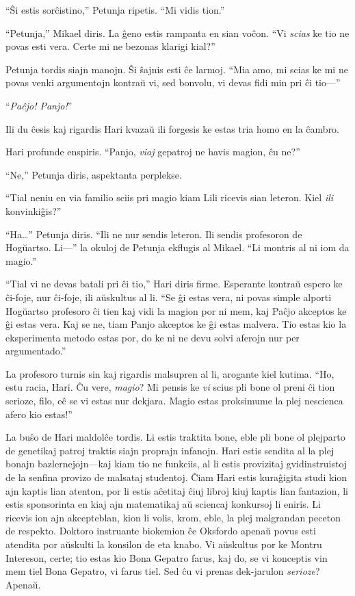 “Ŝi estis sorĉistino,” Petunja ripetis.
“Mi vidis tion.”

“Petunja,” Mikael diris.
La ĝeno estis rampanta en sian voĉon.
“Vi \emph{scias} ke tio ne povas esti vera.
Certe mi ne bezonas klarigi kial?”

Petunja tordis siajn manojn.
Ŝi ŝajnis esti ĉe larmoj.
“Mia amo, mi scias ke mi ne povas venki argumentojn kontraŭ vi, sed bonvolu, vi devas fidi min pri ĉi tio—”

“\emph{Paĉjo! Panjo!}”

Ili du ĉesis kaj rigardis Hari kvazaŭ ili forgesis ke estas tria homo en la ĉambro.

Hari profunde enspiris.
“Panjo, \emph{viaj} gepatroj ne havis magion, ĉu ne?”

“Ne,” Petunja diris, aspektanta perplekse.

“Tial neniu en via familio sciis pri magio kiam Lili ricevis sian leteron.
Kiel \emph{ili} konvinkiĝis?”

“Ha…” Petunja diris.
“Ili ne nur sendis leteron.
Ili sendis profesoron de Hogŭartso.
Li—” la okuloj de Petunja ekflugis al Mikael.
“Li montris al ni iom da magio.”

“Tial vi ne devas batali pri ĉi tio,” Hari diris firme.
Esperante kontraŭ espero ke ĉi-foje, nur ĉi-foje, ili aŭskultus al li.
“Se ĝi estas vera, ni povas simple alporti Hogŭartso profesoro ĉi tien kaj vidi la magion por ni mem, kaj Paĉjo akceptos ke ĝi estas vera.
Kaj se ne, tiam Panjo akceptos ke ĝi estas malvera.
Tio estas kio la eksperimenta metodo estas por, do ke ni ne devu solvi aferojn nur per argumentado.”

La profesoro turnis sin kaj rigardis malsupren al li, arogante kiel kutima.
“Ho, estu racia, Hari.
Ĉu vere, \emph{magio}?
Mi pensis ke \emph{vi} scius pli bone ol preni ĉi tion serioze, filo, eĉ se vi estas nur dekjara.
Magio estas proksimume la plej nescienca afero kio estas!”

La buŝo de Hari maldolĉe tordis.
Li estis traktita bone, eble pli bone ol plejparto de genetikaj patroj traktis siajn proprajn infanojn.
Hari estis sendita al la plej bonajn bazlernejojn—kaj kiam tio ne funkciis, al li estis provizitaj gvidinstruistoj de la senfina provizo de malsataj studentoj.
Ĉiam Hari estis kuraĝigita studi kion ajn kaptis lian atenton, por li estis aĉetitaj ĉiuj libroj kiuj kaptis lian fantazion, li estis sponsorinta en kiaj ajn matematikaj aŭ sciencaj konkursoj li eniris.
Li ricevis ion ajn akcepteblan, kion li volis, krom, eble, la plej malgrandan peceton de respekto.
Doktoro instruante biokemion ĉe Oksfordo apenaŭ povus esti atendita por aŭskulti la konsilon de eta knabo.
Vi aŭskultus por ke Montru Intereson, certe; tio estas kio Bona Gepatro farus, kaj do, se vi konceptis vin mem tiel Bona Gepatro, vi farus tiel.
Sed ĉu vi prenas dek-jarulon \emph{serioze}?
Apenaŭ.

